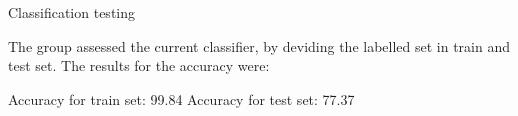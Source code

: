 Classification testing


The group assessed the current classifier, by deviding the labelled set in train and test set. The results for the accuracy were:

Accuracy for train set: 99.84%
Accuracy for test set:	77.37%